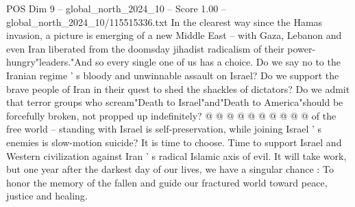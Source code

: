 \begin{textsample}{POS Dim 9 – global\_north\_2024\_10 – Score 1.00 – global\_north\_2024\_10/115515336.txt}
In the clearest way since the Hamas invasion, a picture is emerging of a new Middle East -- with Gaza, Lebanon and even Iran liberated from the doomsday jihadist radicalism of their power-hungry"leaders."And so every single one of us has a choice.
Do we say no to the Iranian regime ' s bloody and unwinnable assault on Israel?
Do we support the brave people of Iran in their quest to shed the shackles of dictators?
Do we admit that terror groups who scream"Death to Israel"and"Death to America"should be forcefully broken, not propped up indefinitely? @ @ @ @ @ @ @ @ @ @ of the free world -- standing with Israel is self-preservation, while joining Israel ' s enemies is slow-motion suicide?
It is time to choose.
Time to support Israel and Western civilization against Iran ' s radical Islamic axis of evil.
It will take work, but one year after the darkest day of our lives, we have a singular chance : To honor the memory of the fallen and guide our fractured world toward peace, justice and healing.

\end{textsample}
